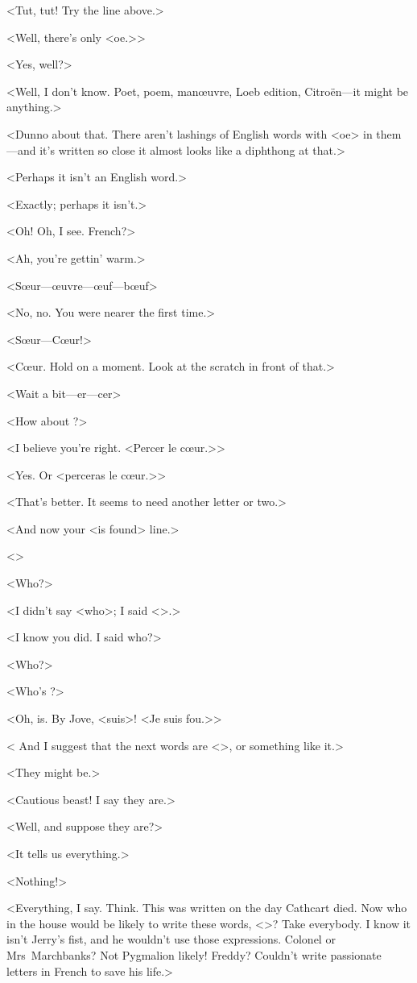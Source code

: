 <Tut, tut! Try the line above.>

<Well, there's only <oe.>>

<Yes, well?>

<Well, I don't know. Poet, poem, manœuvre, Loeb edition, Citroën—it might be anything.>

<Dunno about that. There aren't lashings of English words with <oe> in them—and it's written so close it almost looks like a diphthong at that.>

<Perhaps it isn't an English word.>

<Exactly; perhaps it isn't.>

<Oh! Oh, I see. French?>

<Ah, you're gettin' warm.>

<Sœur—œuvre—œuf—bœuf\longdash>

<No, no. You were nearer the first time.>

<Sœur—Cœur!>

<Cœur. Hold on a moment. Look at the scratch in front of that.>

<Wait a bit—er—cer\longdash>

<How about ?>

<I believe you're right. <Percer le cœur.>>

<Yes. Or <perceras le cœur.>>

<That's better. It seems to need another letter or two.>

<And now your <is found> line.>

<>

<Who?>

<I didn't say <who>; I said <>.>

<I know you did. I said who?>

<Who?>

<Who's ?>

<Oh, is. By Jove, <suis>! <Je suis fou.>>

< And I suggest that the next words are <>, or something like it.>

<They might be.>

<Cautious beast! I say they are.>

<Well, and suppose they are?>

<It tells us everything.>

<Nothing!>

<Everything, I say. Think. This was written on the day Cathcart died. Now who in the house would be likely to write these words, <>? Take everybody. I know it isn't Jerry's fist, and he wouldn't use those expressions. Colonel or Mrs~Marchbanks? Not Pygmalion likely! Freddy? Couldn't write passionate letters in French to save his life.>

